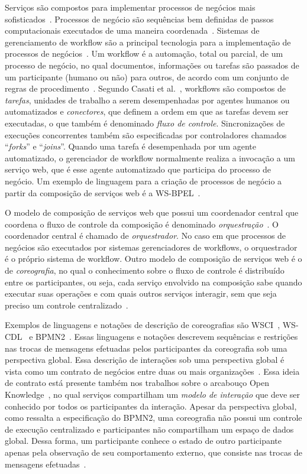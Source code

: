 Serviços são compostos para implementar processos de negócios mais sofisticados~\cite{Papazoglou2007State}. Processos de negócio são sequências bem definidas de passos computacionais executados de uma maneira coordenada~\cite{Alonso2002Atomicity}. Sistemas de gerenciamento de workflow são a principal tecnologia para a implementação de processos de negócios~\cite{Agostini2000Improving}.  Um workflow é a automação, total ou parcial, de um processo de negócio, no qual documentos, informações ou tarefas são passados de um participante (humano ou não) para outros, de acordo com um conjunto de regras de procedimento~\cite{WorkflowCoalition1999}. Segundo Casati et al.~\cite{Casati1998Workflow}, workflows são compostos de \emph{tarefas}, unidades de trabalho a serem desempenhadas por agentes humanos ou automatizados e \emph{conectores}, que definem a ordem em que as tarefas devem ser executadas, o que também é denominado \emph{fluxo de controle}. Sincronizações de execuções concorrentes também são especificadas por controladores chamados ``\emph{forks}'' e ``\emph{joins}''. Quando uma tarefa é desempenhada por um agente automatizado, o gerenciador de workflow normalmente realiza a invocação a um serviço web, que é esse agente automatizado que participa do processo de negócio. Um exemplo de linguagem para a criação de processos de negócio a partir da composição de serviços web é a WS-BPEL~\cite{BPEL2007}.

O modelo de composição de serviços web que possui um coordenador central que coordena o fluxo de controle da composição é denominado \emph{orquestração}~\cite{Nanda2004Decentralizing}. O coordenador central é chamado de \emph{orquestrador}. No caso em que processos de negócios são executados por sistemas gerenciadores de workflows, o orquestrador é o próprio sistema de workflow. Outro modelo de composição de serviços web é o de \emph{coreografia}, no qual o conhecimento sobre o fluxo de controle é distribuído entre os participantes, ou seja, cada serviço envolvido na composição sabe quando executar suas operações e com quais outros serviços interagir, sem que seja preciso um controle centralizado~\cite{Barker2009Choreographing}.

Exemplos de linguagens e notações de descrição de coreografias são WSCI~\cite{WSCI2002}, WS-CDL~\cite{WSCDL2005} e BPMN2~\cite{BPMN2011}. Essas linguagens e notações descrevem sequências e restrições nas trocas de mensagens efetuadas pelos participantes da coreografia sob uma perspectiva global. Essa descrição de interações sob uma perspectiva global é vista como um contrato de negócios entre duas ou mais organizações~\cite{BPMN2011}. 
Essa ideia de contrato está presente também nos trabalhos sobre o arcabouço Open Knowledge~\cite{Besana2008OpenKnowledge},
no qual serviços compartilham um \emph{modelo de interação} que deve ser conhecido por todos os participantes da interação.
Apesar da perspectiva global, como ressalta a especificação do BPMN2, uma coreografia não possui um controle de execução centralizado e participantes não compartilham um espaço de dados global. Dessa forma, um participante conhece o estado de outro participante apenas pela observação de seu comportamento externo, que consiste nas trocas de mensagens efetuadas~\cite{BPMN2011}.


